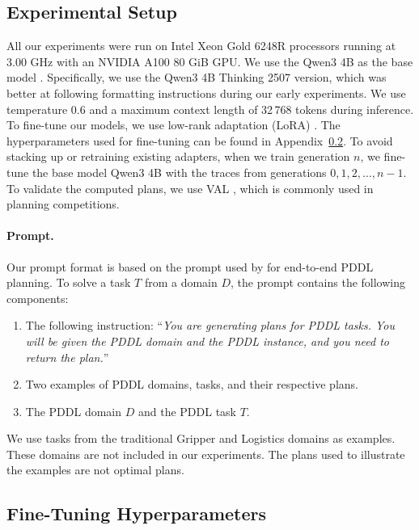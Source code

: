 \subsection{Experimental Setup}
\label{sec:ExperimentalSetup}
All our experiments were run on Intel Xeon Gold 6248R processors running at
3.00 GHz with an NVIDIA A100 80 GiB GPU.
We use the Qwen3 4B as the base model \citep{qwen3-tr}. Specifically, we use the
Qwen3 4B Thinking 2507 version, which was better at following formatting
instructions during our early experiments. We use temperature $0.6$ and a
maximum context length of 32\,768 tokens during inference.
To fine-tune our models, we use low-rank adaptation (LoRA)
\citep{hu-et-al-iclr2022}. The hyperparameters used for fine-tuning can be found
in Appendix~\ref{sec:hyperparameters}. To avoid stacking up or retraining existing adapters,
when we train generation $n$, we fine-tune the base model Qwen3 4B with the
traces from generations $0, 1, 2, \dots, n-1$. To validate the computed plans, we use
VAL \citep{howey-long-icaps2003wscompetition}, which is commonly used in
planning competitions.


\paragraph{Prompt.}

Our prompt format is based on the prompt used by \citet{correa-et-al-neurips2025}
for end-to-end PDDL planning. To solve a task $T$ from a domain $D$, the
prompt contains the following components:

\begin{enumerate}
\item The following instruction: ``\textit{You are generating plans for PDDL tasks. You
  will be given the PDDL domain and the PDDL instance, and you need to return
  the plan.}''
\item Two examples of PDDL domains, tasks, and their respective plans.
\item The PDDL domain $D$ and the PDDL task $T$.
\end{enumerate}
We use tasks from the traditional Gripper and Logistics domains as
examples. These domains are not included in our experiments. The plans used
to illustrate the examples are not optimal plans.



\subsection{Fine-Tuning Hyperparameters}
\label{sec:hyperparameters}

